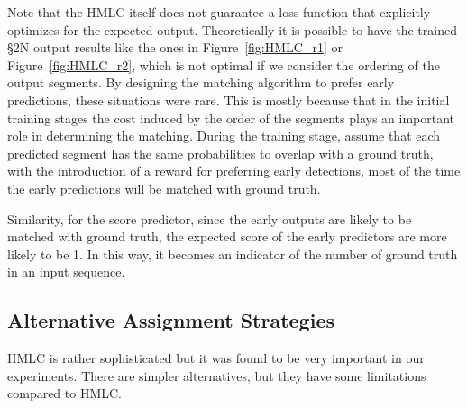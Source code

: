 \documentclass[10pt,journal,compsoc]{IEEEtran}
\begin{document}
Note that the HMLC itself does not guarantee a loss function that explicitly optimizes for the expected output. Theoretically it is possible to have the trained \S2N output results like the ones in Figure~\ref{fig:HMLC_r1} or Figure~\ref{fig:HMLC_r2}, which is not optimal if we consider the ordering of the output segments. By designing the matching algorithm to prefer early predictions, these situations were rare. This is mostly because that in the initial training stages the cost induced by the order of the segments plays an important role in determining the matching. During the training stage, assume that each predicted segment has the same probabilities to overlap with a ground truth, with the introduction of a reward for preferring early detections, most of the time the early predictions will be matched with ground truth.


Similarity, for the score predictor, since the early outputs are likely to be matched with ground truth, the expected score of the early predictors are more likely to be 1. In this way, it becomes an indicator of the number of ground truth in an input sequence.
  


%
%
% 
%
%
%
%
%
%
%
%

\subsection{Alternative Assignment Strategies~\label{sec:alternatives_intro}}
HMLC is rather sophisticated but it was found to be very important in our experiments. There are simpler alternatives, but they have some limitations compared to HMLC. 


\end{document}
